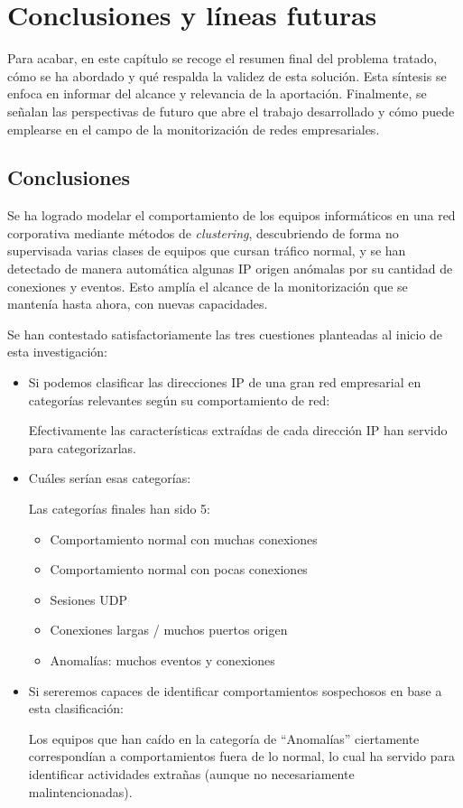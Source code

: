 \chapter{Conclusiones y líneas futuras}\label{chap:conclusiones}

Para acabar, en este capítulo se recoge el resumen final del problema tratado, cómo se ha abordado y qué respalda la validez de esta solución.
Esta síntesis se enfoca en informar del alcance y relevancia de la aportación.
Finalmente, se señalan las perspectivas de futuro que abre el trabajo desarrollado y cómo puede emplearse en el campo de la monitorización de redes empresariales.

\section{Conclusiones}\label{sec:conclusiones}

Se ha logrado modelar el comportamiento de los equipos informáticos en una red corporativa mediante métodos de \emph{clustering},
descubriendo de forma no supervisada varias clases de equipos que cursan tráfico normal,
y se han detectado de manera automática algunas IP origen anómalas por su cantidad de conexiones y eventos.
Esto amplía el alcance de la monitorización que se mantenía hasta ahora, con nuevas capacidades.

Se han contestado satisfactoriamente las tres cuestiones planteadas al inicio de esta investigación:
\begin{itemize}
    \item Si podemos clasificar las direcciones IP de una gran red empresarial en categorías relevantes según su comportamiento de red:

        Efectivamente las características extraídas de cada dirección IP han servido para categorizarlas.
    \item Cuáles serían esas categorías:

        Las categorías finales han sido 5:
        \begin{itemize}
            \item Comportamiento normal con muchas conexiones
            \item Comportamiento normal con pocas conexiones
            \item Sesiones UDP
            \item Conexiones largas / muchos puertos origen
            \item Anomalías: muchos eventos y conexiones
        \end{itemize}
    \item Si sereremos capaces de identificar comportamientos sospechosos en base a esta clasificación:

        Los equipos que han caído en la categoría de ``Anomalías'' ciertamente correspondían a comportamientos fuera de lo normal,
        lo cual ha servido para identificar actividades extrañas (aunque no necesariamente malintencionadas).
\end{itemize}

